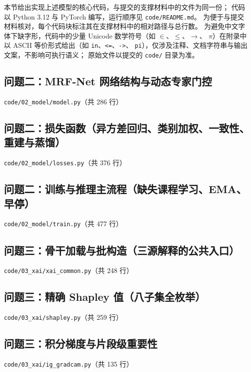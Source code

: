
本节给出实现上述模型的核心代码，与提交的支撑材料中的文件为同一份；
代码以 Python 3.12 与 PyTorch 编写，运行顺序见 \texttt{code/README.md}。
为便于与提交材料核对，每个代码块标注其在支撑材料中的相对路径与总行数。
为避免中文字体下缺字形，代码中的少量 Unicode 数学符号（如 $\in$、$\le$、$\to$、
$\pi$）在附录中以 ASCII 等价形式给出（如 \texttt{in}、\texttt{<=}、\texttt{->}、
\texttt{pi}），仅涉及注释、文档字符串与输出文案，不影响可执行语义；
原始文件以提交的 \texttt{code/} 目录为准。

\subsection{问题二：MRF-Net 网络结构与动态专家门控}
\noindent\texttt{code/02\_model/model.py}（共 286 行）


\subsection{问题二：损失函数（异方差回归、类别加权、一致性、重建与蒸馏）}
\noindent\texttt{code/02\_model/losses.py}（共 376 行）


\subsection{问题二：训练与推理主流程（缺失课程学习、EMA、早停）}
\noindent\texttt{code/02\_model/train.py}（共 477 行）


\subsection{问题三：骨干加载与批构造（三源解释的公共入口）}
\noindent\texttt{code/03\_xai/xai\_common.py}（共 248 行）


\subsection{问题三：精确 Shapley 值（八子集全枚举）}
\noindent\texttt{code/03\_xai/shapley.py}（共 259 行）


\subsection{问题三：积分梯度与片段级重要性}
\noindent\texttt{code/03\_xai/ig\_gradcam.py}（共 135 行）


